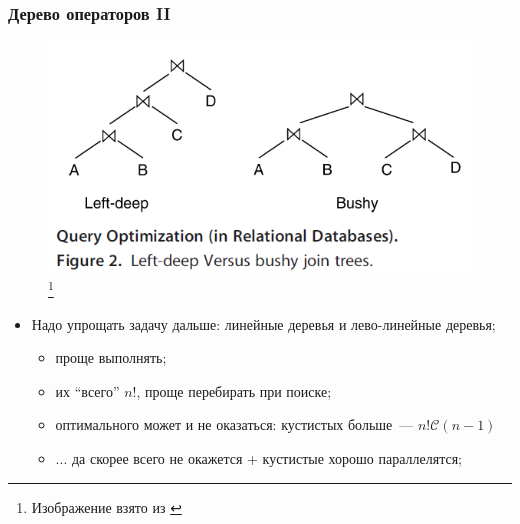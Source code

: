 \documentclass{beamer}
\begin{document}
\begin{frame}
\frametitle{Дерево операторов II}

\begin{figure}[htb]
\includegraphics[width=\textwidth,height=0.3\textheight,keepaspectratio]{trees.png} 
\footnote{\tiny{Изображение взято из \cite{Neumann2009}}}
\end{figure}


\begin{itemize}
  \item Надо упрощать задачу дальше: линейные деревья и лево-линейные деревья;
  \begin{itemize}
    \item проще выполнять;
    \item их ``всего'' $n!$, проще перебирать при поиске;
    \item оптимального может и не оказаться: кустистых больше~--- $n!\mathcal{C}(n-1)$
    \item ... да скорее всего не окажется + кустистые хорошо параллелятся;
  \end{itemize}  
\end{itemize}

\end{frame}
\end{document}
